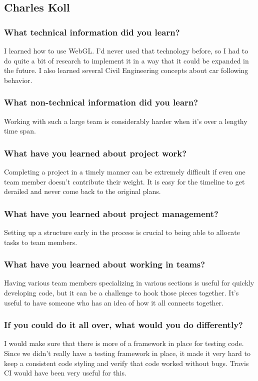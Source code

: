 \documentclass[onecolumn, draftclsnofoot,10pt, compsoc]{IEEEtran}
\begin{document}
\subsection{Charles Koll}
\subsubsection{What technical information did you learn?}
I learned how to use WebGL.
I'd never used that technology before, so I had to do quite a bit of research to implement it in a way that it could be expanded in the future.
I also learned several Civil Engineering concepts about car following behavior.
\subsubsection{What non-technical information did you learn?}
Working with such a large team is considerably harder when it's over a lengthy time span.
\subsubsection{What have you learned about project work?}
Completing a project in a timely manner can be extremely difficult if even one team member doesn't contribute their weight.
It is easy for the timeline to get derailed and never come back to the original plans.
\subsubsection{What have you learned about project management?}
Setting up a structure early in the process is crucial to being able to allocate tasks to team members.
\subsubsection{What have you learned about working in teams?}
Having various team members specializing in various sections is useful for quickly developing code, but it can be a challenge to hook those pieces together.
It's useful to have someone who has an idea of how it all connects together.
\subsubsection{If you could do it all over, what would you do differently?}
I would make sure that there is more of a framework in place for testing code.
Since we didn't really have a testing framework in place, it made it very hard to keep a consistent code styling and verify that code worked without bugs.
Travis CI would have been very useful for this.
\appendices
\end{document}
